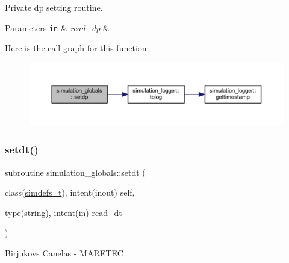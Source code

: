 Private dp setting routine. 
\begin{DoxyParams}[1]{Parameters}
\mbox{\tt in}  & {\em read\+\_\+dp} & \\
\hline
\end{DoxyParams}
Here is the call graph for this function\+:
\nopagebreak
\begin{figure}[H]
\begin{center}
\leavevmode
\includegraphics[width=350pt]{namespacesimulation__globals_a9a8e88c06937b7cf6be9d9bf30f54ba9_cgraph}
\end{center}
\end{figure}
\mbox{\label{namespacesimulation__globals_a3ef0462db5a60ac79304cabd2fdd914d}} 
\subsubsection{\texorpdfstring{setdt()}{setdt()}}
{\footnotesize\ttfamily subroutine simulation\+\_\+globals\+::setdt (\begin{DoxyParamCaption}\item[{class(\mbox{\hyperlink{structsimulation__globals_1_1simdefs__t}{simdefs\+\_\+t}}), intent(inout)}]{self,  }\item[{type(string), intent(in)}]{read\+\_\+dt }\end{DoxyParamCaption})\hspace{0.3cm}{\ttfamily [private]}}



Birjukovs Canelas -\/ M\+A\+R\+E\+T\+EC 

